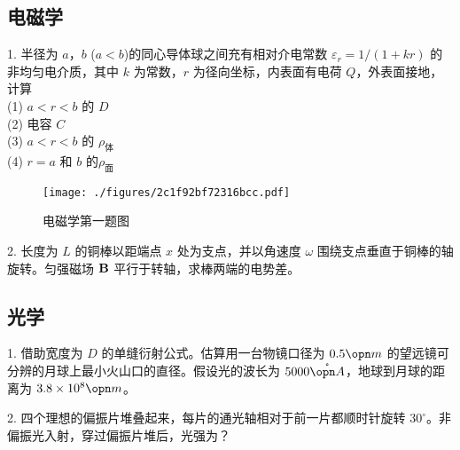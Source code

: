 \subsection{电磁学}
1. 半径为 $a$，$b$ ($a<b$)的同心导体球之间充有相对介电常数 $\varepsilon_r=1/(1+kr)$ 的非均匀电介质，其中 $k$ 为常数，$r$ 为径向坐标，内表面有电荷 $Q$，外表面接地，计算\\
(1) $ a<r<b $ 的 $D$\\
(2) 电容 $C$\\
(3) $ a<r<b $ 的 $\rho_{\text{体}}$\\
(4) $ r=a $ 和 $b$ 的$\rho_{\text{面}}$
\begin{figure}[ht]
\centering
\texttt{[image: ./figures/2c1f92bf72316bcc.pdf]}
\caption{电磁学第一题图} \label{fig_NJU12_4}
\end{figure}
2. 长度为 $L$ 的铜棒以距端点 $x$ 处为支点，并以角速度 $\omega$ 围绕支点垂直于铜棒的轴旋转。匀强磁场 $\bf B$ 平行于转轴，求棒两端的电势差。
\subsection{光学}
1. 借助宽度为 $D$ 的单缝衍射公式。估算用一台物镜口径为 $0.5 \opn m$ 的望远镜可分辨的月球上最小火山口的直径。假设光的波长为 $5000\mathring{\opn A}$，地球到月球的距离为 $3.8\times 10^8 \opn m$。

2. 四个理想的偏振片堆叠起来，每片的通光轴相对于前一片都顺时针旋转 $30^\circ$。非偏振光入射，穿过偏振片堆后，光强为？
